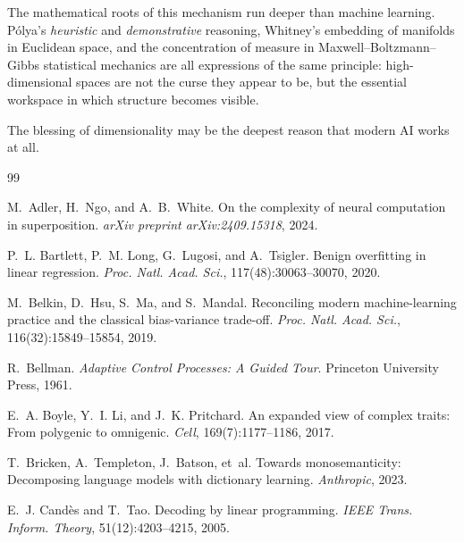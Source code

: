 \documentclass[11pt,a4paper]{article}
\theoremstyle{plain}
\theoremstyle{definition}
\theoremstyle{remark}
\begin{document}
The mathematical roots of this mechanism run deeper than machine learning.
P\'olya's \emph{heuristic} and \emph{demonstrative} reasoning, Whitney's
embedding of manifolds in Euclidean space, and the concentration of measure in
Maxwell--Boltzmann--Gibbs statistical mechanics are all expressions of the same
principle: high-dimensional spaces are not the curse they appear to be, but the
essential workspace in which structure becomes visible.

The blessing of dimensionality may be the deepest reason that modern AI works at
all.



\begin{thebibliography}{99}

M.~Adler, H.~Ngo, and A.~B.~White.
\newblock On the complexity of neural computation in superposition.
\newblock \emph{arXiv preprint arXiv:2409.15318}, 2024.

P.~L. Bartlett, P.~M. Long, G.~Lugosi, and A.~Tsigler.
\newblock Benign overfitting in linear regression.
\newblock \emph{Proc. Natl. Acad. Sci.}, 117(48):30063--30070, 2020.

M.~Belkin, D.~Hsu, S.~Ma, and S.~Mandal.
\newblock Reconciling modern machine-learning practice and the classical
  bias-variance trade-off.
\newblock \emph{Proc. Natl. Acad. Sci.}, 116(32):15849--15854, 2019.

R.~Bellman.
\newblock \emph{Adaptive Control Processes: A Guided Tour}.
\newblock Princeton University Press, 1961.

E.~A. Boyle, Y.~I. Li, and J.~K. Pritchard.
\newblock An expanded view of complex traits: From polygenic to omnigenic.
\newblock \emph{Cell}, 169(7):1177--1186, 2017.

T.~Bricken, A.~Templeton, J.~Batson, et~al.
\newblock Towards monosemanticity: Decomposing language models with dictionary
  learning.
\newblock \emph{Anthropic}, 2023.

E.~J. Cand\`es and T.~Tao.
\newblock Decoding by linear programming.
\newblock \emph{IEEE Trans. Inform. Theory}, 51(12):4203--4215, 2005.


\end{thebibliography}
\end{document}

